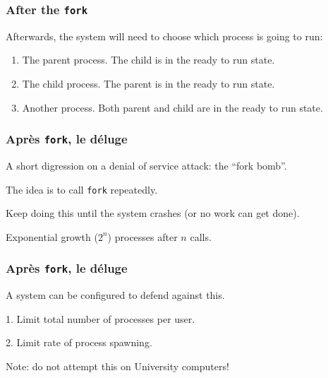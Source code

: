 \begin{frame}
\frametitle{After the \texttt{fork}}

Afterwards, the system will need to choose which process is going to run: 

\begin{enumerate}
	\item The parent process. The child is in the ready to run state.
	\item The child process. The parent is in the ready to run state.
	\item Another process. Both parent and child are in the ready to run state.
\end{enumerate}

\end{frame}


\begin{frame}
\frametitle{Apr\`{e}s \texttt{fork}, le d\'{e}luge}

A short digression on a denial of service attack: the ``fork bomb''.

The idea is to call \texttt{fork} repeatedly.

Keep doing this until the system crashes (or no work can get done).

Exponential growth ($2^n$) processes after $n$ calls.

\end{frame}


\begin{frame}
\frametitle{Apr\`{e}s \texttt{fork}, le d\'{e}luge}
A system can be configured to defend against this.

1. Limit total number of processes per user.

2. Limit rate of process spawning.

Note: do not attempt this on University computers!

\end{frame}




